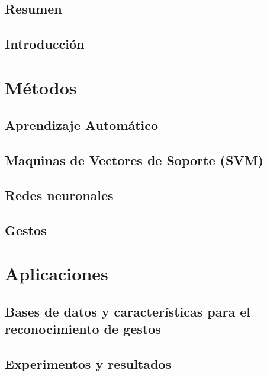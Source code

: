 \documentclass[a4paper,draft, 12pt]{book}
\begin{document}
\renewcommand{\chaptername}{}
 

\frontmatter
\tableofcontents
\mainmatter 
 
\chapter{Resumen }

\chapter{Introducción}

\part{Métodos}
\label{part:metodos}

\chapter{Aprendizaje Automático }

  \chapter{Maquinas de Vectores de Soporte (SVM)}
  
  \chapter{Redes neuronales }

\chapter{Gestos}

\part{Aplicaciones}
\label{part:aplicaciones}

\chapter{Bases de datos y características para el reconocimiento de gestos }

\chapter{Experimentos y resultados}

\backmatter

	

\end{document}

